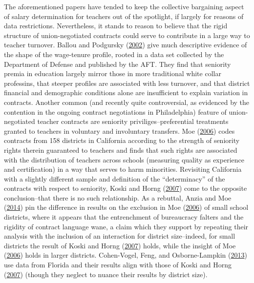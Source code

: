 \documentclass[12pt,]{article}
\begin{document}
The aforementioned papers have tended to keep the collective bargaining
aspect of salary determination for teachers out of the spotlight, if
largely for reasons of data restrictions. Nevertheless, it stands to
reason to believe that the rigid structure of union-negotiated contracts
could serve to contribute in a large way to teacher turnover. Ballou and
Podgursky (\protect\hyperlink{ref-ballou}{2002}) give much descriptive
evidence of the shape of the wage-tenure profile, rooted in a data set
collected by the Department of Defense and published by the AFT. They
find that seniority premia in education largely mirror those in more
traditional white collar professins, that steeper profiles are
associated with less turnover, and that district financial and
demographic conditions alone are insufficient to explain variation in
contracts. Another common (and recently quite controversial, as
evidenced by the contention in the ongoing contract negotiations in
Philadelphia) feature of union-negotiated teacher contracts are
seniority priviliges--preferential treatments granted to teachers in
voluntary and involuntary transfers. Moe
(\protect\hyperlink{ref-moe}{2006}) codes contracts from 158 districts
in California according to the strength of seniority rights therein
guaranteed to teachers and finds that such rights are associated with
the distribution of teachers across schools (measuring quality as
experience and certification) in a way that serves to harm minorities.
Revisiting California with a slightly different sample and definition of
the ``determinacy'' of the contracts with respect to seniority, Koski
and Horng (\protect\hyperlink{ref-koski}{2007}) come to the opposite
conclusion--that there is no such relationship. As a rebuttal, Anzia and
Moe (\protect\hyperlink{ref-anzia}{2014}) pin the difference in results
on the exclusion in Moe (\protect\hyperlink{ref-moe}{2006}) of small
school districts, where it appears that the entrenchment of bureaucracy
falters and the rigidity of contract language wane, a claim which they
support by repeating their analysis with the inclusion of an interaction
for district size--indeed, for small districts the result of Koski and
Horng (\protect\hyperlink{ref-koski}{2007}) holds, while the insight of
Moe (\protect\hyperlink{ref-moe}{2006}) holds in larger districts.
Cohen-Vogel, Feng, and Osborne-Lampkin
(\protect\hyperlink{ref-cohenvogel}{2013}) use data from Florida and
their results align with those of Koski and Horng
(\protect\hyperlink{ref-koski}{2007}) (though they neglect to nuance
their results by district size).
\end{document}
